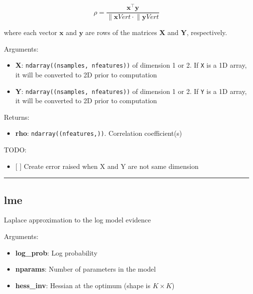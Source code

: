 \[
\rho = \frac{\mathbf x^\top \mathbf y}{\lVert \mathbf x Vert \cdot \lVert \mathbf y Vert}
\]

where each vector \(\mathbf x\) and \(\mathbf y\) are rows of the
matrices \(\mathbf X\) and \(\mathbf Y\), respectively.

Arguments:

\begin{itemize}
\tightlist
\item
  \textbf{X}: \texttt{ndarray((nsamples,\ nfeatures))} of dimension 1 or
  2. If \texttt{X} is a 1D array, it will be converted to 2D prior to
  computation
\item
  \textbf{Y}: \texttt{ndarray((nsamples,\ nfeatures))} of dimension 1 or
  2. If \texttt{Y} is a 1D array, it will be converted to 2D prior to
  computation
\end{itemize}

Returns:

\begin{itemize}
\tightlist
\item
  \textbf{rho}: \texttt{ndarray((nfeatures,))}. Correlation
  coefficient(s)
\end{itemize}

TODO:

\begin{itemize}
\tightlist
\item
  {[} {]} Create error raised when X and Y are not same dimension
\end{itemize}

\begin{center}\rule{0.5\linewidth}{\linethickness}\end{center}

\hypertarget{lme}{%
\subsection{lme}\label{lme}}

\begin{Shaded}
\begin{Highlighting}[]
\end{Highlighting}
\end{Shaded}

Laplace approximation to the log model evidence

Arguments:

\begin{itemize}
\tightlist
\item
  \textbf{log\_prob}: Log probability
\item
  \textbf{nparams}: Number of parameters in the model
\item
  \textbf{hess\_inv}: Hessian at the optimum (shape is \(K \times K\))
\end{itemize}

